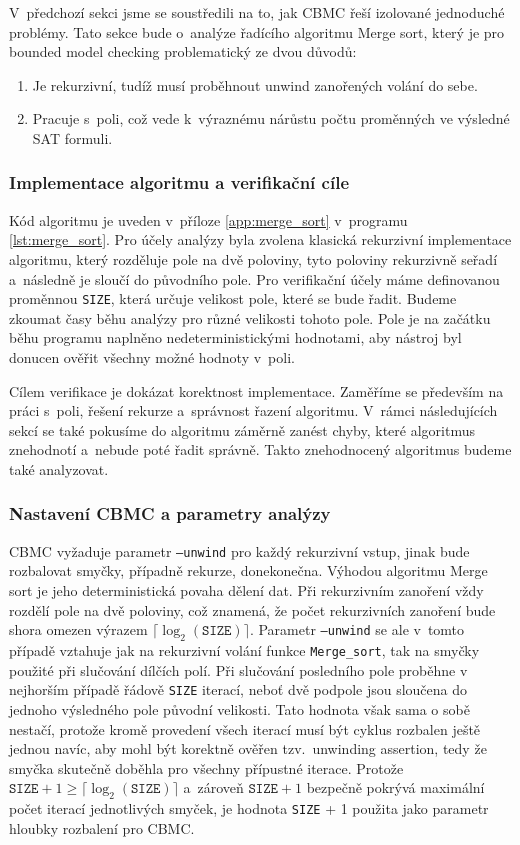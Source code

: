 \documentclass[a4paper, 11pt]{article}
\begin{document}
V~předchozí sekci jsme se soustředili na to, jak CBMC řeší izolované jednoduché problémy.
Tato sekce bude o~analýze řadícího algoritmu Merge sort, který je pro bounded model checking problematický ze dvou důvodů:
\begin{enumerate}
    \item Je rekurzivní, tudíž musí proběhnout unwind zanořených volání do sebe.
    \item Pracuje s~poli, což vede k~výraznému nárůstu počtu proměnných ve výsledné SAT formuli.
\end{enumerate}

\subsubsection{Implementace algoritmu a verifikační cíle}

Kód algoritmu je uveden v~příloze \ref{app:merge_sort} v~programu \ref{lst:merge_sort}.
Pro účely analýzy byla zvolena klasická rekurzivní implementace algoritmu, který rozděluje pole na dvě poloviny, tyto poloviny rekurzivně seřadí a~následně je sloučí do původního pole.
Pro verifikační účely máme definovanou proměnnou \texttt{SIZE}, která určuje velikost pole, které se bude řadit.
Budeme zkoumat časy běhu analýzy pro různé velikosti tohoto pole.
Pole je na začátku běhu programu naplněno nedeterministickými hodnotami, aby nástroj byl donucen ověřit všechny možné hodnoty v~poli.

Cílem verifikace je dokázat korektnost implementace.
Zaměříme se především na práci s~poli, řešení rekurze a~správnost řazení algoritmu.
V~rámci následujících sekcí se také pokusíme do algoritmu záměrně zanést chyby, které algoritmus znehodnotí a~nebude poté řadit správně.
Takto znehodnocený algoritmus budeme také analyzovat.

\subsubsection{Nastavení CBMC a parametry analýzy}

CBMC vyžaduje parametr \texttt{--unwind} pro každý rekurzivní vstup, jinak bude rozbalovat smyčky, případně rekurze, donekonečna.
Výhodou algoritmu Merge sort je jeho deterministická povaha dělení dat.
Při rekurzivním zanoření vždy rozdělí pole na dvě poloviny, což znamená, že počet rekurzivních zanoření bude shora omezen výrazem $\lceil \log_2(\texttt{SIZE}) \rceil$.
Parametr \texttt{--unwind} se ale v~tomto případě vztahuje jak na rekurzivní volání funkce \texttt{Merge\_sort}, tak na smyčky použité při slučování dílčích polí.
Při slučování posledního pole proběhne v nejhorším případě řádově \texttt{SIZE} iterací, neboť dvě podpole jsou sloučena do jednoho výsledného pole původní velikosti.
Tato hodnota však sama o sobě nestačí, protože kromě provedení všech iterací musí být cyklus rozbalen ještě jednou navíc, aby mohl být korektně ověřen tzv.~unwinding assertion, tedy že smyčka skutečně doběhla pro všechny přípustné iterace.
Protože $\texttt{SIZE} + 1 \ge \lceil \log_2(\texttt{SIZE}) \rceil$ a~zároveň $\texttt{SIZE} + 1$ bezpečně pokrývá maximální počet iterací jednotlivých smyček, je hodnota \texttt{SIZE} + 1 použita jako parametr hloubky rozbalení pro CBMC.
\end{document}
